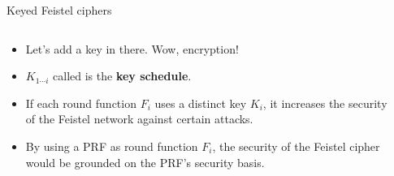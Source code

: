 \documentclass[aspectratio=169, lualatex, handout]{beamer}
\begin{document}
\begin{frame}{Keyed Feistel ciphers}
	\begin{columns}[c]
		\begin{column}{0.6\textwidth}
			\begin{itemize}
				\item Let's add a key in there. Wow, encryption!
				\item $K_{1\cdots i}$ called is the \textbf{key schedule}.
				\item If each round function $F_i$ uses a distinct key $K_i$, it increases the security of the Feistel network against certain attacks.
				\item By using a PRF as round function $F_i$, the security of the Feistel cipher would be grounded on the PRF's security basis.
			\end{itemize}
		\end{column}
		\begin{column}{0.4\textwidth}
			\begin{center}
			\end{center}
		\end{column}
	\end{columns}
\end{frame}
\end{document}
